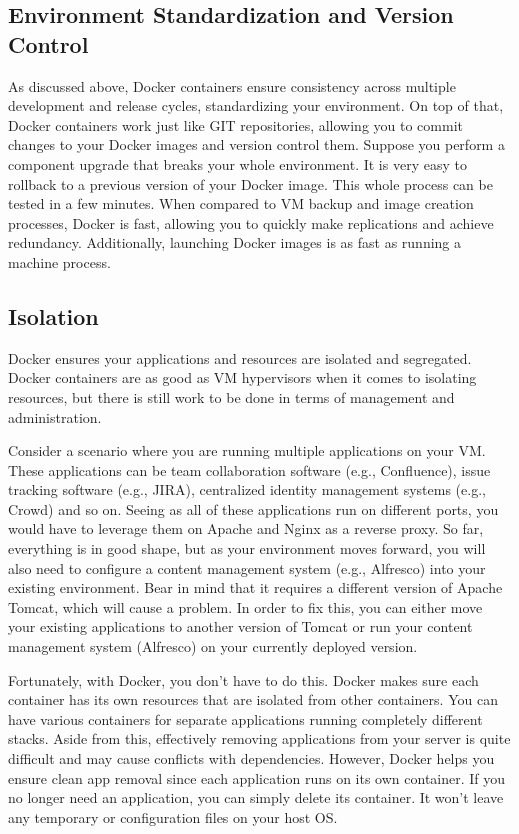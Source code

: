 \documentclass[sigconf]{acmart}
\begin{document}
	\subsection{Environment Standardization and Version Control}
	As discussed above, Docker containers ensure consistency across multiple development and release cycles, standardizing your environment. On top of that, Docker containers work  just like GIT repositories, allowing you to commit changes to your Docker images and version control them. Suppose you perform a component upgrade that breaks your whole environment. It is very easy to rollback to a previous version of your Docker image. This whole process can be tested in a few minutes. When compared to VM backup and image creation processes, Docker is fast, allowing you to quickly make replications and achieve redundancy. Additionally, launching Docker images is as fast as running a machine process.
	\subsection{Isolation}
	Docker ensures your applications and resources are isolated and segregated. Docker containers are as good as VM hypervisors when it comes to isolating resources, but there is still work to be done in terms of management and administration. \cite{Container_VM}
	
	Consider a scenario where you are running multiple applications on your VM. These applications can be team collaboration software (e.g., Confluence), issue tracking software (e.g., JIRA), centralized identity management systems (e.g., Crowd) and so on. Seeing as all of these applications run on different ports, you would have to leverage them on Apache and Nginx as a reverse proxy. So far, everything is in good shape, but as your environment moves forward, you will also need to configure a content management system (e.g., Alfresco) into your existing environment. Bear in mind that it requires a different version of Apache Tomcat, which will cause a problem. In order to fix this, you can either move your existing applications to another version of Tomcat or run your content management system (Alfresco) on your currently deployed version.
	
	Fortunately, with Docker, you don't have to do this. Docker makes sure each container has its own resources that are isolated from other containers. You can have various containers for separate applications running completely different stacks. Aside from this, effectively removing applications from your server is quite difficult and may cause conflicts with dependencies. However, Docker helps you ensure clean app removal since each application runs on its own container. If you no longer need an application, you can simply delete its container. It won't leave any temporary or configuration files on your host OS.
	
\end{document}
